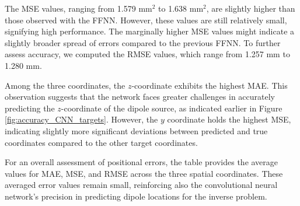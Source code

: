 \documentclass[a4paper, UKenglish, 11pt]{uiomaster}
\begin{document}
The MSE values, ranging from 1.579 mm$^2$ to 1.638 mm$^2$, are slightly higher than those observed with the FFNN. However, these values are still relatively small, signifying high performance. The marginally higher MSE values might indicate a slightly broader spread of errors compared to the previous FFNN. To further assess accuracy, we computed the RMSE values, which range from 1.257 mm to 1.280 mm.

Among the three coordinates, the $z$-coordinate exhibits the highest MAE. This observation suggests that the network faces greater challenges in accurately predicting the $z$-coordinate of the dipole source, as indicated earlier in Figure \ref{fig:accuracy_CNN_targets}. However, the $y$ coordinate holds the highest MSE, indicating slightly more significant deviations between predicted and true coordinates compared to the other target coordinates.

For an overall assessment of positional errors, the table provides the average values for MAE, MSE, and RMSE across the three spatial coordinates. These averaged error values remain small, reinforcing also the convolutional neural network's precision in predicting dipole locations for the inverse problem.
\end{document}
